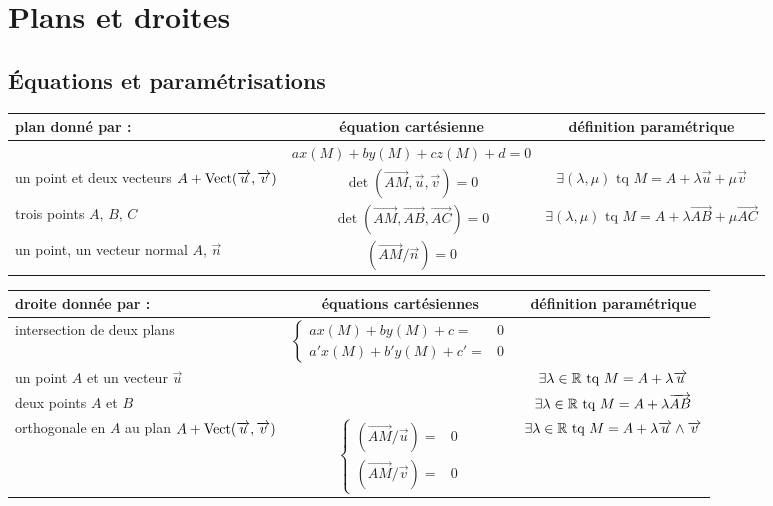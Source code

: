 \section{Plans et droites}
\subsection{\'Equations et paramétrisations}
\renewcommand{\arraystretch}{1.8}
\begin{center}
\begin{tabular}{p{4cm}|c|c}
plan donné par : & équation cartésienne & définition paramétrique \\ \hline 
 & $ax(M)+by(M)+cz(M)+d=0$ &  \\ \hline
un point et deux vecteurs $A+\mathop{\mathrm{Vect}}(\overrightarrow{u},\overrightarrow{v})$ & $\det(\overrightarrow{AM},\overrightarrow{u},\overrightarrow{v})=0$ &
$\exists(\lambda,\mu) \text{ tq } M= A +\lambda\overrightarrow{u}+\mu\overrightarrow{v}$\\ \hline 
trois points $A, \, B,\, C$ &
$\det(\overrightarrow{AM},\overrightarrow{AB},\overrightarrow{AC})=0$ &
$\exists(\lambda,\mu) \text{ tq } M= A +\lambda\overrightarrow{AB}+\mu\overrightarrow{AC}$ \\ \hline
un point, un vecteur normal $A$, $\overrightarrow n$ &
$(\overrightarrow{AM}/\overrightarrow{n})=0$ &
\\ \hline
\end{tabular}
\end{center}
\renewcommand{\arraystretch}{2.6}
\begin{center}
\begin{tabular}{p{4cm}|c|c}
 droite donnée par : & équations cartésiennes & définition paramétrique\\ \hline
intersection de deux plans &
$\left\lbrace  
\begin{aligned}
 ax(M)+by(M)+c=&0\\
 a'x(M)+b'y(M)+c'=&0
\end{aligned}
\right. $
& \\ \hline
un point $A$ et un vecteur $\overrightarrow u$ &
 &
$\exists\lambda \in \mathbb{R} \text{ tq } M=A+\lambda \overrightarrow u$ \\ \hline
deux points $A$ et $B$ &
 &
$\exists\lambda \in \mathbb{R} \text{ tq } M=A+\lambda \overrightarrow{AB}$ \\ \hline
orthogonale en $A$ au plan $A+\mathop{\mathrm{Vect}}(\overrightarrow u , \overrightarrow v)$ &
$\left\lbrace  
\begin{aligned}
 (\overrightarrow{AM}/\overrightarrow u)=& 0\\
 (\overrightarrow{AM}/\overrightarrow v)=& 0
\end{aligned}
\right. $ &
$\exists\lambda \in \mathbb{R} \text{ tq } M=A+\lambda \overrightarrow u \wedge \overrightarrow v$ \\ \hline
\end{tabular}
\end{center}
